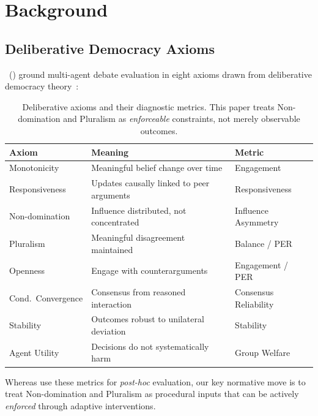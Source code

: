 \section{Background}
\label{sec:background}

\subsection{Deliberative Democracy Axioms}

\citeauthor{diagnostic2026}~(\citeyear{diagnostic2026}) ground multi-agent
debate evaluation in eight axioms drawn from deliberative democracy
theory~\cite{fishkin2009deliberation,arrow1950difficulty,sen1970collective}:

\begin{table}[h]
\centering
\caption{Deliberative axioms and their diagnostic metrics.
This paper treats Non-domination and Pluralism as \emph{enforceable}
constraints, not merely observable outcomes.}
\label{tab:axioms}
\small
\begin{tabular}{lll}
\toprule
\textbf{Axiom} & \textbf{Meaning} & \textbf{Metric} \\
\midrule
Monotonicity        & Meaningful belief change over time      & Engagement \\
Responsiveness      & Updates causally linked to peer arguments & Responsiveness \\
Non-domination      & Influence distributed, not concentrated & Influence Asymmetry \\
Pluralism           & Meaningful disagreement maintained      & Balance / PER \\
Openness            & Engage with counterarguments            & Engagement / PER \\
Cond.\ Convergence  & Consensus from reasoned interaction     & Consensus Reliability \\
Stability           & Outcomes robust to unilateral deviation & Stability \\
Agent Utility       & Decisions do not systematically harm    & Group Welfare \\
\bottomrule
\end{tabular}
\end{table}

Whereas \citeauthor{diagnostic2026} use these metrics for \emph{post-hoc}
evaluation, our key normative move is to treat Non-domination and Pluralism
as procedural inputs that can be actively \emph{enforced} through adaptive
interventions.

